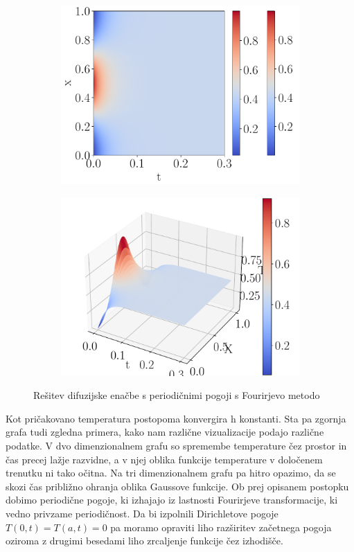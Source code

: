 \documentclass{article}
\begin{document}
\begin{figure}[H]
    \centering
    \begin{subfigure}{0.45\textwidth}
        \centering
        \includegraphics[width=\linewidth]{fourier2d.pdf}
    \end{subfigure}
    \hspace{0.5cm}
    \begin{subfigure}{0.45\textwidth}
        \centering
        \includegraphics[width=\linewidth]{fourier3d.pdf}
    \end{subfigure}
	\caption{Rešitev difuzijske enačbe s periodičnimi pogoji s Fourirjevo metodo}
\end{figure}
Kot pričakovano temperatura postopoma konvergira h konstanti. Sta pa zgornja grafa tudi zgledna primera, kako nam različne vizualizacije podajo različne podatke. V dvo dimenzionalnem grafu so spremembe temperature čez prostor in čas precej lažje razvidne, a v njej oblika funkcije temperature v določenem trenutku ni tako očitna. Na tri dimenzionalnem grafu pa hitro opazimo, da se skozi čas približno ohranja oblika Gaussove funkcije. Ob prej opisanem postopku dobimo periodične pogoje, ki izhajajo iz lastnosti Fourirjeve transformacije, ki vedno privzame periodičnost. Da bi izpolnili Dirichletove pogoje $T(0,t)=T(a,t)=0$ pa moramo opraviti liho razširitev začetnega pogoja oziroma z drugimi besedami liho zrcaljenje funkcije čez izhodišče.
\end{document}
